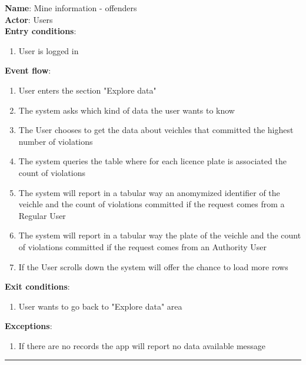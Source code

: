 \begin{enumerate}
\begin{itemize}
		\textbf{Name}: Mine information - offenders \\
		\textbf{Actor}: Users   \\
		\textbf{Entry conditions}:
		\begin{enumerate}
			\item{User is logged in}
		\end{enumerate}
		\textbf{Event flow}:
		\begin{enumerate}
			\item{User enters the section "Explore data"}
			\item{The system asks which kind of data the user wants to know}
      \item{The User chooses to get the data about veichles that committed the highest number of violations}
      \item{The system queries the table where for each licence plate is associated the count of violations }
      \item{The system will report in a tabular way an anomymized identifier of the veichle and the count of violations committed if the request comes from a Regular User}
      \item{The system will report in a tabular way the plate of the veichle and the count of violations committed if the request comes from an Authority User}
      \item{If the User scrolls down the system will offer the chance to load more rows}
		\end{enumerate}
		\textbf{Exit conditions}:
    \begin{enumerate}
      \item{User wants to go back to "Explore data" area}
    \end{enumerate}
		\textbf{Exceptions}:
		\begin{enumerate}
			\item{If there are no records the app will report no data available message}
		\end{enumerate}
		\rule{\linewidth}{0.4pt}


\end{itemize}
\end{enumerate}
